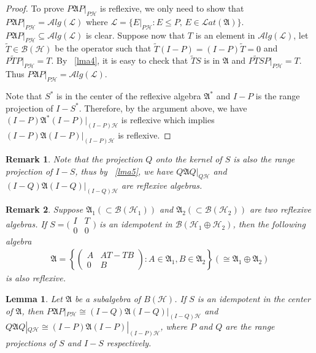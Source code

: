\documentclass[a4paper,10pt]{amsart}
\newtheorem{lemma}{Lemma}[section]
\newtheorem{remark}{Remark}[section]
\theoremstyle{refs}
\newcommand{\AAA}{\mathfrak A}
\newcommand{\BBB}{\mathcal B}
\newcommand{\HHH}{\mathcal H} %
\newcommand{\LLL}{\mathcal L} %
\newcommand{\Lat}{\mathcal Lat}
\newcommand{\Alg}{\mathcal Alg}
\begin{document}
\begin{proof}
To prove $P \AAA P |_{P\HHH}$ is reflexive, we only need to show that
$P \AAA P|_{P\HHH} = \Alg(\LLL)$ where
$\LLL = \{ E|_{P\HHH} : E \leq P \mbox{, }  E \in \Lat(\AAA) \}$.
$P \AAA P|_{P\HHH} \subseteq \Alg(\LLL)$
is clear. Suppose now that $T$ is an element in $\Alg(\LLL)$, let
$\widetilde{T} \in \BBB(\HHH)$ be the operator such that $\widetilde{T}(I-P) =
(I-P)\widetilde{T} = 0$ and $P\widetilde{T}P|_{P\HHH} = T$. By ~\cref{lma4}, it
is easy to check that $\widetilde{T}S$ is in $\AAA$ and
$P\widetilde{T}SP|_{P\HHH} = T$. Thus $P \AAA P |_{P\HHH} = \Alg(\LLL)$.

Note that $S^{*}$ is in the center of the reflexive algebra $\AAA^{*}$ and $I-P$
is the range projection of $I-S^{*}$. Therefore, by the argument above, we have
$(I-P)\AAA^{*} (I-P) |_{(I-P)\HHH}$ is reflexive which implies $(I-P)\AAA
(I-P) |_{(I-P)\HHH}$ is reflexive.
\end{proof}

\begin{remark}\label{rem1}
Note that the projection $Q$ onto the kernel of $S$ is also the range
projection of $I-S$, thus by ~\cref{lma5}, we have $Q\AAA Q |_{Q\HHH}$ and
$(I-Q)\AAA (I-Q)|_{(I-Q)\HHH}$ are reflexive algebras.
\end{remark}

\begin{remark} \label{rem2}
Suppose $\AAA_1 (\subset \BBB(\HHH_1))$ and $\AAA_2 (\subset \BBB(\HHH_2))$ are
two reflexive algebras. If $S =
\bigl(\begin{smallmatrix}
           I & T \\
           0 & 0
           \end{smallmatrix} \bigr)$
is an idempotent in $\BBB(\HHH_1 \oplus \HHH_2)$, then the following algebra
\begin{align*}
\AAA = \left \{ \begin{pmatrix}
 A & AT - TB\\
 0 & B
\end{pmatrix} : A \in \AAA_1, B \in \AAA_2 \right \}(\cong \AAA_1 \oplus
\AAA_2)
\end{align*}
is also reflexive.
\end{remark}



\begin{lemma} \label{lma6}
Let $\AAA$ be a subalgebra of $B(\HHH)$.
If $S$ is an idempotent in the center of $\AAA$,
then $P\AAA P |_{P\HHH} \cong (I-Q)\AAA
(I-Q) |_{(I-Q)\HHH}$ and $Q\AAA Q |_{Q\HHH} \cong (I-P)\AAA
(I-P) |_{(I-P)\HHH}$, where $P$ and $Q$ are the range projections
of $S$ and $I-S$ respectively.
\end{lemma}
\end{document}
